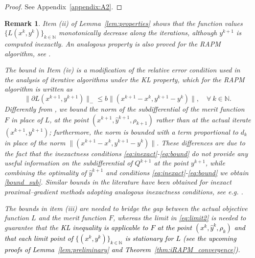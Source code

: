 \documentclass[pdflatex,sn-mathphys-num]{sn-jnl}
\numberwithin{equation}{section}%
\def\N{\mathbb{N}}
\newcommand{\REV}[1]{\textcolor{black}{#1}}
\theoremstyle{thmstyleone}%
\theoremstyle{thmstyletwo}%
\newtheorem{remark}{Remark}[section]%
\theoremstyle{thmstylethree}%
\begin{document}
\begin{proof}
See Appendix~\ref{appendix:A2}.
\end{proof}

\begin{remark}
Item (ii) of Lemma~\ref{lem:properties} shows that the function values $\{L(x^k,y^k)\}_{k\in\N}$ monotonically decrease along the iterations, although $y^{k+1}$ is computed inexactly. An analogous property is also proved for the RAPM algorithm, see \cite[Lemma 3.1(i)]{attouch2010proximal}.

The bound in Item (iv) is a modification of the relative error condition used in the analysis of iterative algorithms under the KL property, which for the RAPM algorithm is written as \cite [Eq. (24)]{attouch2010proximal}
\begin{equation*}
    \|\partial L(x^{k+1},y^{k+1})\|_-\leq b\|(x^{k+1}-x^k,y^{k+1}-y^k)\|, \quad \forall \ k\in\N. 
\end{equation*}
Differently from \cite{attouch2010proximal}, we bound the norm of the subdifferential of the merit function $F$ in place of $L$, at the point $(x^{k+1},\hat{y}^{k+1},{\rho_{k+1}})$ rather than at the actual iterate $(x^{k+1},y^{k+1})$; furthermore, the norm is bounded with a term proportional to $d_k$ in place of the norm $\|(x^{k+1}-x^k,y^{k+1}-y^k)\|$. These differences are due to the fact that the inexactness conditions \eqref{eq:inexact}-\eqref{eq:bound} do not provide any useful information on the subdifferential of $Q^{k+1}$ at the point $y^{k+1}$, while combining the optimality of $\hat{y}^{k+1}$ and conditions \eqref{eq:inexact}-\eqref{eq:bound} we obtain \eqref{bound_sub}. Similar bounds in the literature have been obtained for inexact proximal--gradient methods adopting analogous inexactness conditions, see e.g. \cite{Bonettini-Ochs-Prato-Rebegoldi-2023,Bonettini-Prato-Rebegoldi-2021}.

The bounds in item (iii) are needed to bridge the gap between the actual objective function $L$ and the merit function $F$, whereas the limit in \eqref{eq:limit2} is needed to guarantee that the \REV{KL inequality is applicable to $F$ at the point $(x^k,\hat{y}^k,\rho_k)$ and that each limit point of $\{(x^k,y^k)\}_{k\in\N}$ is stationary for $L$ (see the upcoming proofs of Lemma~\ref{lem:preliminary} and Theorem~\ref{thm:iRAPM_convergence}).}
\end{remark}
\end{document}
